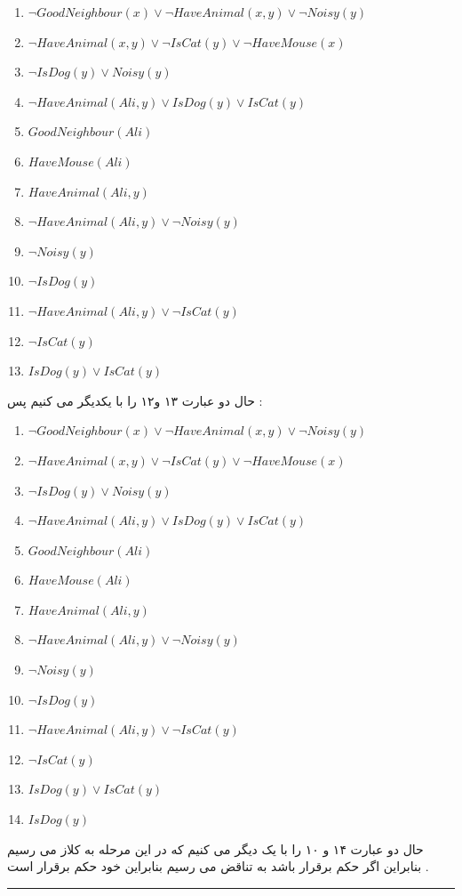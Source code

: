 \documentclass{article}
\begin{document}
\begin{center}
	\begin{enumerate}
		\item $ \neg GoodNeighbour(x) \lor\neg HaveAnimal(x,y)  \lor \neg Noisy(y)$
		\item $ \neg HaveAnimal(x,y) \lor \neg IsCat(y)\lor \neg HaveMouse(x)$
		\item $ \neg IsDog(y) \lor Noisy(y)$
		\item $ \neg HaveAnimal(Ali,y) \lor IsDog(y) \lor IsCat(y)$
		\item $ GoodNeighbour(Ali)$
		\item $HaveMouse(Ali)$
		\item $HaveAnimal(Ali,y)$
		\item $\neg HaveAnimal(Ali,y) \lor \neg Noisy(y)$
		\item $ \neg Noisy(y)$
		\item $\neg IsDog(y)$
		\item $\neg HaveAnimal(Ali,y) \lor \neg IsCat(y)$
		\item $\neg IsCat(y)$
		\item $IsDog(y) \lor IsCat(y)$
	\end{enumerate}
\end{center}
حال دو عبارت ۱۳ و۱۲ را با یکدیگر 
می کنیم پس  :
\begin{center}
	\begin{enumerate}
		\item $ \neg GoodNeighbour(x) \lor\neg HaveAnimal(x,y)  \lor \neg Noisy(y)$
		\item $ \neg HaveAnimal(x,y) \lor \neg IsCat(y)\lor \neg HaveMouse(x)$
		\item $ \neg IsDog(y) \lor Noisy(y)$
		\item $ \neg HaveAnimal(Ali,y) \lor IsDog(y) \lor IsCat(y)$
		\item $ GoodNeighbour(Ali)$
		\item $HaveMouse(Ali)$
		\item $HaveAnimal(Ali,y)$
		\item $\neg HaveAnimal(Ali,y) \lor \neg Noisy(y)$
		\item $ \neg Noisy(y)$
		\item $\neg IsDog(y)$
		\item $\neg HaveAnimal(Ali,y) \lor \neg IsCat(y)$
		\item $\neg IsCat(y)$
		\item $IsDog(y) \lor IsCat(y)$
		\item $IsDog(y)$
	\end{enumerate}
\end{center}
حال دو عبارت ۱۴ و ۱۰ را با یک دیگر 
می کنیم که در این مرحله به کلاز 
می رسیم بنابراین اگر 
حکم برقرار باشد به تناقض می رسیم بنابراین خود حکم برقرار است  . 
\hrule
\end{document}
